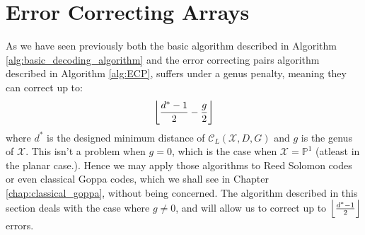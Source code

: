 \section{Error Correcting Arrays}
As we have seen previously both the basic algorithm described in Algorithm \ref{alg:basic_decoding_algorithm} and the error correcting pairs algorithm described in Algorithm \ref{alg:ECP}, suffers under a genus penalty, meaning they can correct up to:
\begin{equation*}
  \left\lfloor\frac{d^{*} - 1}{2} - \frac{g}{2}\right\rfloor
\end{equation*}
where $d^{*}$ is the designed minimum distance of $\mathcal{C}_L(\mathcal{X}, D, G)$ and $g$ is the genus of $\mathcal{X}$. This isn't a problem when $g = 0$, which is the case when $\mathcal{X} = \mathbb{P}^1$ (atleast in the planar case.). Hence we may apply those algorithms to Reed Solomon codes or even classical Goppa codes, which we shall see in Chapter \ref{chap:classical_goppa}, without being concerned. The algorithm described in this section deals with the case where $g \neq 0$, and will allow us to correct up to $\left\lfloor\frac{d^{*} - 1}{2}\right\rfloor$ errors.

